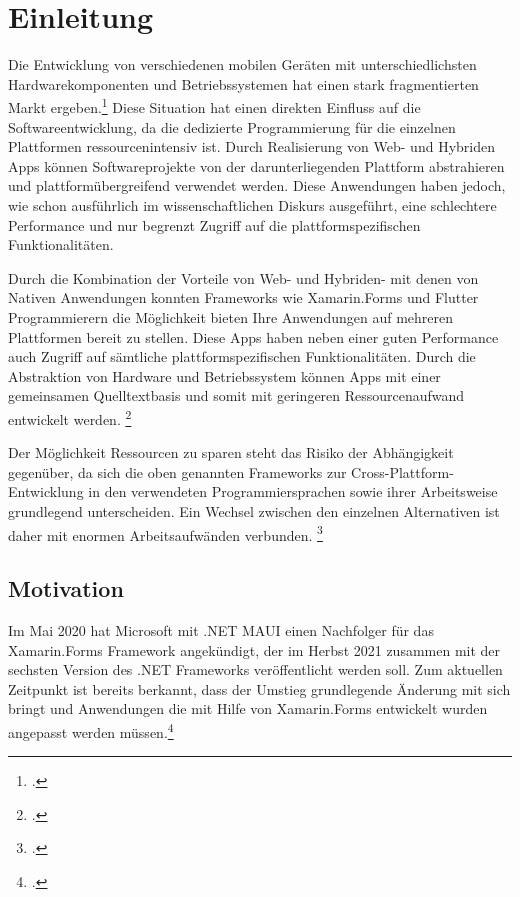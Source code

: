 \chapter{Einleitung}
Die Entwicklung von verschiedenen mobilen Geräten mit unterschiedlichsten Hardwarekomponenten und Betriebssystemen hat einen stark fragmentierten Markt ergeben.\footcite[Vgl.][S. 3]{Joorabchi2016}  Diese Situation hat einen direkten Einfluss auf die Softwareentwicklung, da die dedizierte Programmierung für die einzelnen Plattformen ressourcenintensiv ist.  Durch Realisierung von Web- und  Hybriden Apps können Softwareprojekte von der darunterliegenden Plattform abstrahieren und plattformübergreifend verwendet werden.  Diese Anwendungen haben jedoch, wie schon ausführlich im wissenschaftlichen Diskurs ausgeführt,  eine schlechtere Performance und nur begrenzt Zugriff auf die plattformspezifischen Funktionalitäten. 

Durch die Kombination der Vorteile von Web- und Hybriden- mit denen von Nativen Anwendungen konnten Frameworks wie Xamarin.Forms und Flutter Programmierern die Möglichkeit bieten Ihre Anwendungen auf mehreren Plattformen bereit zu stellen.  Diese Apps haben neben einer guten Performance auch Zugriff auf sämtliche plattformspezifischen Funktionalitäten.  Durch die Abstraktion von Hardware und Betriebssystem können Apps mit einer gemeinsamen Quelltextbasis und somit mit geringeren Ressourcenaufwand entwickelt werden. \footcite[Vgl.][S. 295]{Vollmer2017} 

Der Möglichkeit Ressourcen zu sparen steht das Risiko der Abhängigkeit gegenüber, da sich die oben genannten Frameworks zur Cross-Plattform-Entwicklung in den verwendeten Programmiersprachen sowie ihrer Arbeitsweise grundlegend unterscheiden.  Ein Wechsel zwischen den einzelnen Alternativen ist daher mit enormen Arbeitsaufwänden verbunden. \footcite[Vgl.][S. 64]{Wissel2017}  

\section{Motivation}
Im Mai 2020 hat Microsoft mit .NET MAUI einen Nachfolger für das Xamarin.Forms Framework angekündigt, der im Herbst 2021 zusammen mit der sechsten Version des .NET Frameworks veröffentlicht werden soll. Zum aktuellen Zeitpunkt ist bereits berkannt, dass der Umstieg grundlegende Änderung mit sich bringt und Anwendungen die mit Hilfe von Xamarin.Forms entwickelt wurden angepasst werden müssen.\footcite[Vgl.][Abgerufen am 28.10.2020]{Hunter2020}

